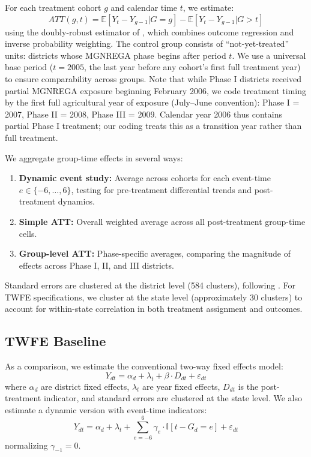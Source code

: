 \documentclass[12pt]{article}
\newcommand{\E}{\mathbb{E}}
\newcommand{\ind}{\mathbb{I}}
\begin{document}
For each treatment cohort $g$ and calendar time $t$, we estimate:
\begin{equation}
ATT(g, t) = \E[Y_t - Y_{g-1} | G = g] - \E[Y_t - Y_{g-1} | G > t]
\end{equation}
using the doubly-robust estimator of \citet{santanna2020doubly}, which combines outcome regression and inverse probability weighting. The control group consists of ``not-yet-treated'' units: districts whose MGNREGA phase begins after period $t$. We use a universal base period ($t = 2005$, the last year before any cohort's first full treatment year) to ensure comparability across groups. Note that while Phase I districts received partial MGNREGA exposure beginning February 2006, we code treatment timing by the first full agricultural year of exposure (July--June convention): Phase I = 2007, Phase II = 2008, Phase III = 2009. Calendar year 2006 thus contains partial Phase I treatment; our coding treats this as a transition year rather than full treatment.

We aggregate group-time effects in several ways:
\begin{enumerate}
  \item \textbf{Dynamic event study:} Average across cohorts for each event-time $e \in \{-6, \ldots, 6\}$, testing for pre-treatment differential trends and post-treatment dynamics.
  \item \textbf{Simple ATT:} Overall weighted average across all post-treatment group-time cells.
  \item \textbf{Group-level ATT:} Phase-specific averages, comparing the magnitude of effects across Phase I, II, and III districts.
\end{enumerate}

Standard errors are clustered at the district level (584 clusters), following \citet{callaway2021difference}. For TWFE specifications, we cluster at the state level (approximately 30 clusters) to account for within-state correlation in both treatment assignment and outcomes.

\subsection{TWFE Baseline}

As a comparison, we estimate the conventional two-way fixed effects model:
\begin{equation}
Y_{dt} = \alpha_d + \lambda_t + \beta \cdot D_{dt} + \varepsilon_{dt}
\end{equation}
where $\alpha_d$ are district fixed effects, $\lambda_t$ are year fixed effects, $D_{dt}$ is the post-treatment indicator, and standard errors are clustered at the state level. We also estimate a dynamic version with event-time indicators:
\begin{equation}
Y_{dt} = \alpha_d + \lambda_t + \sum_{e=-6}^{6} \gamma_e \cdot \ind[t - G_d = e] + \varepsilon_{dt}
\end{equation}
normalizing $\gamma_{-1} = 0$.
\end{document}
